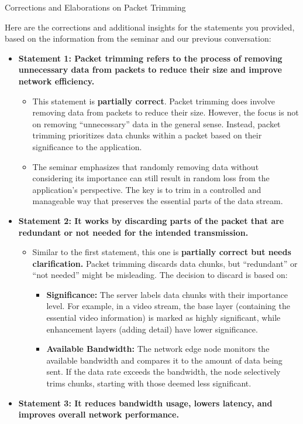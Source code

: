 \documentclass[
]{article}
\author{}
\date{}
\begin{document}
{Corrections and Elaborations on Packet
Trimming}\label{corrections-and-elaborations-on-packet-trimming}

Here are the corrections and additional insights for the statements you
provided, based on the information from the seminar and our previous
conversation:

\begin{itemize}
\item
  \textbf{Statement 1: Packet trimming refers to the process of removing
  unnecessary data from packets to reduce their size and improve network
  efficiency.}

  \begin{itemize}
  
  \item
    This statement is \textbf{partially correct}. Packet trimming does
    involve removing data from packets to reduce their size. However,
    the focus is not on removing ``unnecessary'' data in the general
    sense. Instead, packet trimming prioritizes data chunks within a
    packet based on their significance to the application.
  \item
    The seminar emphasizes that randomly removing data without
    considering its importance can still result in random loss from the
    application's perspective. The key is to trim in a controlled and
    manageable way that preserves the essential parts of the data
    stream.
  \end{itemize}
\item
  \textbf{Statement 2: It works by discarding parts of the packet that
  are redundant or not needed for the intended transmission.}

  \begin{itemize}
  
  \item
    Similar to the first statement, this one is \textbf{partially
    correct but needs clarification.} Packet trimming discards data
    chunks, but ``redundant'' or ``not needed'' might be misleading. The
    decision to discard is based on:

    \begin{itemize}
    
    \item
      \textbf{Significance:} The server labels data chunks with their
      importance level. For example, in a video stream, the base layer
      (containing the essential video information) is marked as highly
      significant, while enhancement layers (adding detail) have lower
      significance.
    \item
      \textbf{Available Bandwidth:} The network edge node monitors the
      available bandwidth and compares it to the amount of data being
      sent. If the data rate exceeds the bandwidth, the node selectively
      trims chunks, starting with those deemed less significant.
    \end{itemize}
  \end{itemize}
\item
  \textbf{Statement 3: It reduces bandwidth usage, lowers latency, and
  improves overall network performance.}


\end{itemize}
\end{document}
